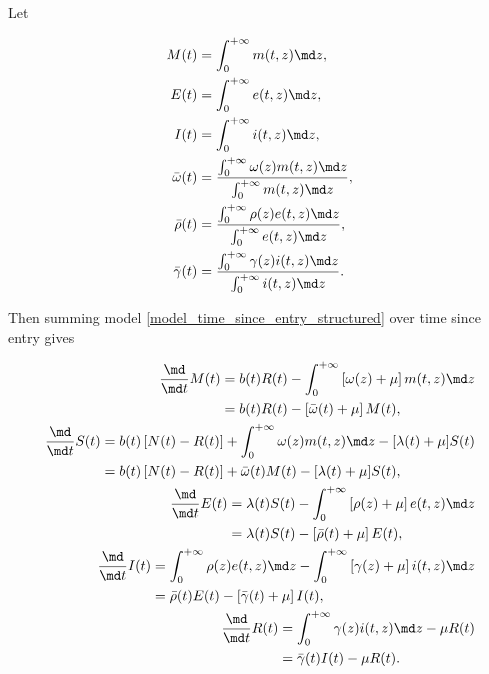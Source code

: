 \documentclass{jpmarticle}
\let\subequationsorig\subequations%
\let\endsubequationsorig\endsubequations%
\renewenvironment{subequations}{
  \subequationsorig
  \renewcommand{\theequation}{\theparentequation.\arabic{equation}}
}{
  \endsubequationsorig
}
\begin{document}
Let
\begin{subequations}
  \begin{align}
    M(t)
    &= \int_0^{+\infty} m(t, z) \md z,
    \\
    E(t)
    &= \int_0^{+\infty} e(t, z) \md z,
    \\
    I(t)
    &= \int_0^{+\infty} i(t, z) \md z,
    \\
    \bar{\omega}(t)
    &= \frac{\int_0^{+\infty} \omega(z) m(t, z) \md z}
      {\int_0^{+\infty} m(t, z) \md z},
    \\
    \bar{\rho}(t)
    &= \frac{\int_0^{+\infty} \rho(z) e(t, z) \md z}
      {\int_0^{+\infty} e(t, z) \md z},
    \\
    \bar{\gamma}(t)
    &= \frac{\int_0^{+\infty} \gamma(z) i(t, z) \md z}
      {\int_0^{+\infty} i(t, z) \md z}.
  \end{align}
\end{subequations}
Then summing model \eqref{model_time_since_entry_structured} over time
since entry gives
\begin{subequations}
  \label{model_time_since_entry_structured_agg_tse}
  \begin{align}
    \begin{split}
      \frac{\md}{\md t} M(t)
      &= b(t) R(t)
      - \int_0^{+\infty} \left[\omega(z) + \mu\right] m(t, z) \md z
      \\
      &= b(t) R(t)
      - \left[\bar{\omega}(t) + \mu\right] M(t),
    \end{split}
    \\
    \begin{split}
      \frac{\md}{\md t} S(t)
      &= b(t) \left[N(t) - R(t)\right]
      + \int_0^{+\infty} \omega(z) m(t, z) \md z
      - [\lambda(t) + \mu] S(t)
      \\
      &= b(t) \left[N(t) - R(t)\right]
      + \bar{\omega}(t) M(t)
      - [\lambda(t) + \mu] S(t),
    \end{split}
    \\
    \begin{split}
      \frac{\md}{\md t} E(t)
      &= \lambda(t) S(t)
      - \int_0^{+\infty} \left[\rho(z) + \mu\right] e(t, z) \md z
      \\
      &= \lambda(t) S(t)
      - \left[\bar{\rho}(t) + \mu\right] E(t),
    \end{split}
    \\
    \begin{split}
      \frac{\md}{\md t} I(t)
      &= \int_0^{+\infty} \rho(z) e(t, z) \md z
      - \int_0^{+\infty} \left[\gamma(z) + \mu\right] i(t, z) \md z
      \\
      &= \bar{\rho}(t) E(t)
      - \left[\bar{\gamma}(t) + \mu\right] I(t),
    \end{split}
    \\
    \begin{split}
      \frac{\md}{\md t} R(t)
      &= \int_0^{+\infty} \gamma(z) i(t, z) \md z
      - \mu R(t)
      \\
      &= \bar{\gamma}(t) I(t)
      - \mu R(t).
    \end{split}
  \end{align}
\end{subequations}
\end{document}
